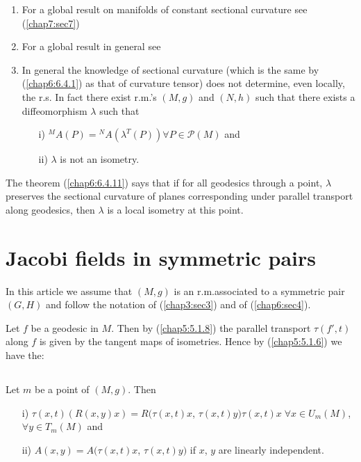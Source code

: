 \begin{remarks*}
\begin{enumerate}
\renewcommand{\labelenumi}{\theenumi)}
\item For a global result on manifolds of constant sectional curvature
  see (\ref{chap7:sec7})

\item For a global result in general see \cite{1}

\item In general the knowledge of sectional curvature (which is the
  same by (\ref{chap6:6.4.1}) as that of curvature tensor) does not
  determine, even locally, the r.s. In fact there exist r.m.'s $(M,g)$
  and $(N,h)$ such \pageoriginale that there exists a diffeomorphism
  $\lambda$ such that 
\begin{itemize}
\item[i)] ${}^{M}A(P)={}^{N}A(\lambda^{T}(P))\forall
P\in\mathscr{P}(M)$ and

\item[ii)] $\lambda$ is not an isometry. 
\end{itemize}
\end{enumerate}
\end{remarks*}

The theorem (\ref{chap6:6.4.11}) says that if for all geodesics through a
point, $\lambda$ preserves the sectional curvature of planes
corresponding under parallel transport along geodesics, then $\lambda$
is a local isometry at this point.

\section{Jacobi fields in symmetric pairs}\label{chap6:sec5}
\quad 
In this article we assume that $(M,g)$ is an r.m.\@ associated to a
symmetric pair $(G,H)$ and follow the notation of (\ref{chap3:sec3}) and of
(\ref{chap6:sec4}).

Let $f$ be a geodesic in $M$. Then by (\ref{chap5:5.1.8}) the parallel
transport $\tau(f',t)$ along $f$ is given by the tangent maps of
isometries. Hence by (\ref{chap5:5.1.6}) we have the:

\subsection{}\label{chap6:6.5.1}

\begin{prop*}
Let $m$ be a point of $(M,g)$. Then 
\begin{itemize}
\item[\rm i)]
  $\tau(x,t)(R(x,y)x)=R(\tau(x,t)x$, $\tau(x,t)y)\tau(x,t)x \; \forall
  x\in  U_{m}(M)$, $\forall y\in T_{m}(M)$ and 

\item[\rm ii)] $A(x,y)=A(\tau(x,t)x$, $\tau(x,t)y)$ if $x$, $y$ are
  linearly independent.
\end{itemize}
\end{prop*}

